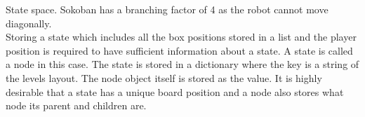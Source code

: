 \documentclass[../../main.tex]{subfiles}
\begin{document}
State space.
Sokoban has a branching factor of 4 as the robot cannot move diagonally. \\	

Storing a state which includes all the box positions stored in a list and the player position is required to have 				sufficient 	information about a state. A state is called a node in this case. The state is stored in a dictionary where 		the key is a string of the levels layout. The node object itself is stored as the value. It is highly desirable that a 			state has a unique board position and a node also stores what node its parent and children are. 
\end{document}
